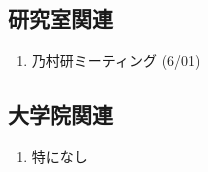 \documentclass[fleqn, 14pt]{extarticle}
\begin{document}
\subsection{研究室関連}
\label{sec-4-2}

\begin{enumerate}

\item 乃村研ミーティング 
\hfill
\label{enum-18}
(6/01)

\end{enumerate}

\subsection{大学院関連}
\begin{enumerate}

\item 特になし
\hfill
\label{enum-17}

\end{enumerate}
\end{document}
